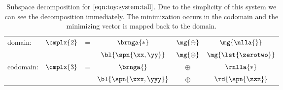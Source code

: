 \begin{table}[htdp]
\caption[Subspace decomposition for equation $\eqref{eqn:toy:system:tall}$]{Subspace decomposition for $\eqref{eqn:toy:system:tall}$. Due to the simplicity of this system we can see the decomposition immediately. The minimization occurs in the codomain and the minimizing vector is mapped back to the domain.}
\begin{center}
\begin{tabular}{lccccc}
%
  domain: & $\cmplx{2}$ & = & $\brnga{*}$ & ${\mg{ \oplus }}$ & ${\mg{ \nlla{} }}$ \\
  &&& ${\bl{ \spn{\xx, \yy} }}$ & ${\mg{ \oplus }}$ & ${\mg{ \lst{\zerotwo} }}$ \\[25pt]
%
  codomain: & $\cmplx{3}$ & = & $\brnga{}$ & $\oplus$ & $\rnlla{*}$ \\
  &&& ${\bl{ \spn{\xxx, \yyy} }}$ & $\oplus$ & ${\rd{ \spn{\zzz} }}$ \\
%
\end{tabular}
\end{center}
\label{tab:least squares:decomposition:tall}
\end{table}


\endinput